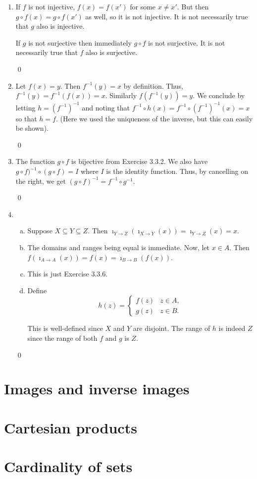 \begin{enumerate}[Ex. 3.3.1.]
    \qed

    \item If $f$ is not injective, $f(x) = f(x')$ for some $x\neq x'$. But then
    $g\circ f(x) = g\circ f(x')$ as well, so it is not injective. It is not
    necessarily true that $g$ also is injective.

    If $g$ is not surjective then immediately $g\circ f$ is not surjective. It
    is not necessarily true that $f$ also is surjective.

    \qed

    \item Let $f(x) = y$. Then $f^{-1}(y) = x$ by definition. Thus,
    $f^{-1}(y) = f^{-1}(f(x)) = x$. Similarly $f(f^{-1}(y)) = y$. We conclude
    by letting $h = (f^{-1})^{-1}$ and noting that $f^{-1}\circ h(x) = f^{-1}\circ
    (f^{-1})^{-1}(x) = x$ so that $h = f$. (Here we used the uniqueness of the inverse,
    but this can easily be shown).

    \qed

    \item The function $g\circ f$ is bijective from Exercise 3.3.2. We also have
    $g\circ f)^{-1}\circ(g\circ f) = I$ where $I$ is the identity function. Thus,
    by cancelling on the right, we get $(g\circ f)^{-1} = f^{-1}\circ g^{-1}$.

    \qed

    \item
    \begin{enumerate}[(a)]
        \item Suppose $X\subseteq Y\subseteq Z$. Then $\imath_{Y\to Z}(\imath_{X\to Y}(x)) =
        \imath_{Y\to Z}(x) = x$. 

        \item The domains and ranges being equal is immediate. Now, let $x\in A$. Then
        $f(\imath_{A\to A}(x)) = f(x) = \imath_{B\to B}(f(x))$.

        \item This is just Exercise 3.3.6.

        \item Define
        \[ h(z) = \begin{cases}
            f(z) & z\in A, \\
            g(z) & z\in B.
        \end{cases} \]

        This is well-defined since $X$ and $Y$ are disjoint. The range of $h$ is
        indeed $Z$ since the range of both $f$ and $g$ is $Z$.
    \end{enumerate}

    \qed
\end{enumerate}

\section{Images and inverse images}


\section{Cartesian products}


\section{Cardinality of sets}
